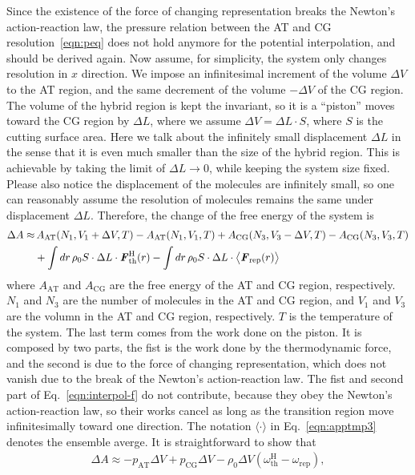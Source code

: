 \documentclass[a4paper,preprint,unsortedaddress]{revtex4-1}
\newcommand{\vect}[1]{\textbf{\textit{#1}}}
\newcommand{\AT}{{\textrm{{AT}}}}
\newcommand{\CG}{{\textrm{CG}}}
\newcommand{\thf}{{\textrm{th}}}
\newcommand{\res}{{\textrm{rep}}}
\newcommand{\hadress}{{\textrm{H}}}
\begin{document}
Since the existence of the force of changing representation breaks the
Newton's action-reaction law, the pressure relation between the AT and CG
resolution~\eqref{eqn:peq} does not hold anymore for the potential interpolation,
and should be derived again.
Now assume, for simplicity, the system only changes resolution in $x$ direction.
We impose an infinitesimal increment of the volume $\Delta V$ to the
AT region, and the same decrement of the volume $-\Delta V$ of the CG
region.  The volume of the hybrid region is kept the invariant,
so it is a ``piston''
moves toward the CG region by $\Delta L$,
where we assume $\Delta V = \Delta L\cdot S$, where $S$ is the
cutting surface area.
Here we talk about the infinitely small displacement  $\Delta L$
in the sense that it is even much smaller than the size of the
hybrid region. This is achievable by taking the limit of $\Delta L\rightarrow 0$,
while keeping the system size fixed.
Please also notice the displacement of the molecules are infinitely small,
so one can reasonably assume
the resolution of molecules remains the same under displacement $\Delta L$.
Therefore, the change of the free energy of the system is
\begin{align}\nonumber
  \Delta A \approx&\,
  A_\AT(N_1, V_1+\Delta V, T) -
  A_\AT(N_1, V_1, T)
  +
  A_\CG(N_3, V_3-\Delta V, T) -
  A_\CG(N_3, V_3, T)\\\label{eqn:apptmp3}
  &+
  \int d r\, \rho_0 S\cdot \Delta L\cdot
  \vect F^\hadress_\thf(r)
  -
  \int d r\, \rho_0 S\cdot \Delta L\cdot
  \big\langle \vect F_\res(r)\big\rangle
\end{align}
where $A_\AT$ and $A_\CG$ are the free energy of the AT and CG region, respectively.
$N_1$ and $N_3$ are the number of molecules in the AT and CG region, and
$V_1$ and $V_3$ are the volumn in the AT and CG region, respectively. $T$ is the temperature
of the system.
The last term comes from the work done on the piston. It is composed by
two parts, the fist is the work done by the thermodynamic force, and the
second is due to 
the force of changing representation, which does not vanish due to the break of the Newton's
action-reaction law. The fist and second part of Eq.~\eqref{eqn:interpol-f}
do not contribute, because they obey the Newton's action-reaction law, so
their works cancel as long as the transition region move infinitesimally toward one direction.
The notation $\langle\cdot\rangle$ in Eq.~\eqref{eqn:apptmp3} denotes the ensemble averge.
It is straightforward to show that 
\begin{align}\label{eqn:peq-d}
  \Delta A \approx
  -p_\AT\Delta V + p_\CG\Delta V -
  \rho_0 \Delta V (\omega_\thf^\hadress - \omega_\res), 
\end{align}
\end{document}

